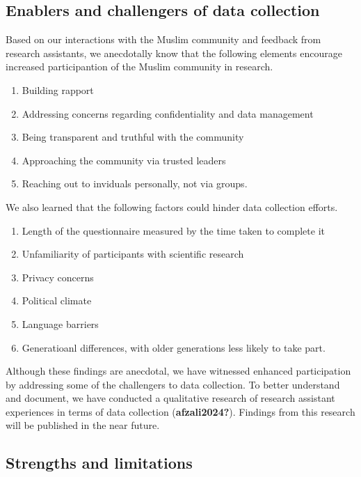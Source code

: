 \documentclass[
]{interact}
\providecommand{\tightlist}{%
  \setlength{\itemsep}{0pt}\setlength{\parskip}{0pt}}\usepackage{longtable,booktabs,array}
\begin{document}
\subsection{Enablers and challengers of data
collection}\label{enablers-and-challengers-of-data-collection}

Based on our interactions with the Muslim community and feedback from
research assistants, we anecdotally know that the following elements
encourage increased participantion of the Muslim community in research.

\begin{enumerate}
\def\labelenumi{\arabic{enumi}.}
\tightlist
\item
  Building rapport
\item
  Addressing concerns regarding confidentiality and data management
\item
  Being transparent and truthful with the community
\item
  Approaching the community via trusted leaders
\item
  Reaching out to inviduals personally, not via groups.
\end{enumerate}

We also learned that the following factors could hinder data collection
efforts.

\begin{enumerate}
\def\labelenumi{\arabic{enumi}.}
\tightlist
\item
  Length of the questionnaire measured by the time taken to complete it
\item
  Unfamiliarity of participants with scientific research
\item
  Privacy concerns
\item
  Political climate
\item
  Language barriers
\item
  Generatioanl differences, with older generations less likely to take
  part.
\end{enumerate}

Although these findings are anecdotal, we have witnessed enhanced
participation by addressing some of the challengers to data collection.
To better understand and document, we have conducted a qualitative
research of research assistant experiences in terms of data collection
(\textbf{afzali2024?}). Findings from this research will be published in
the near future.

\subsection{Strengths and limitations}\label{strengths-and-limitations}
\end{document}
